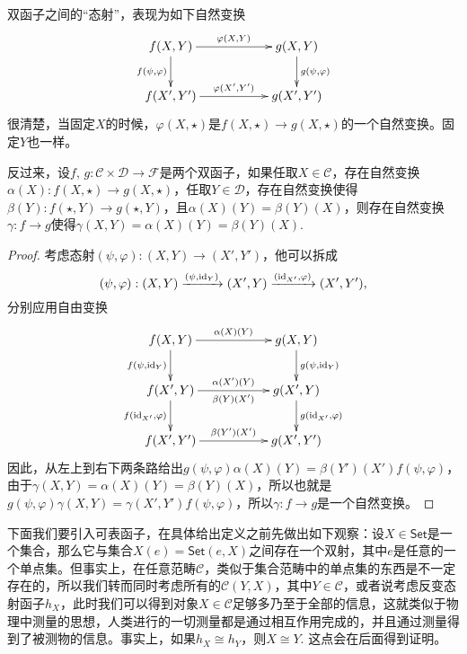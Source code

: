 \para 双函子之间的“态射”，表现为如下自然变换
\[
\begin{xy}
	\xymatrix{
		f(X,Y)\ar[rr]^{\varphi(X,Y)} \ar[d]_{f(\psi,\varphi)}&&g(X,Y) \ar[d]^{g(\psi,\varphi)}\\
		f(X',Y')\ar[rr]^{\varphi(X',Y')}&&g(X',Y')
	}
\end{xy}
\]
很清楚，当固定$X$的时候，$\varphi(X,\star)$是$f(X,\star)\to g(X,\star)$的一个自然变换。固定$Y$也一样。

反过来，设$f$, $g:\mathcal{C}\times \mathcal{D}\to \mathcal{F}$是两个双函子，如果任取$X\in \mathcal{C}$，存在自然变换$\alpha(X):f(X,\star)\to g(X,\star)$，任取$Y\in \mathcal{D}$，存在自然变换使得$\beta(Y):f(\star,Y)\to g(\star,Y)$，且$\alpha(X)(Y)=\beta(Y)(X)$，则存在自然变换$\gamma:f\to g$使得$\gamma(X,Y)=\alpha(X)(Y)=\beta(Y)(X)$.

\begin{proof}
	考虑态射$(\psi,\varphi):(X,Y)\to (X',Y')$，他可以拆成
	\[
		(\psi,\varphi): (X,Y) \xrightarrow{(\psi,\operatorname{id}_Y)} (X',Y)\xrightarrow{(\operatorname{id}_{X'},\varphi)} (X',Y'),
	\]
	分别应用自由变换
	\[
	\begin{xy}
		\xymatrix{
			f(X,Y)\ar[rr]^{\alpha(X)(Y)} \ar[d]_{f(\psi,\id_Y)}&&g(X,Y) \ar[d]^{g(\psi,\id_Y)}\\
			f(X',Y)\ar[rr]^{\alpha(X')(Y)}_{\beta(Y)(X')} \ar[d]_{f(\id_{X'},\varphi)}&&g(X',Y) \ar[d]^{g(\id_{X'},\varphi)}\\
			f(X',Y')\ar[rr]^{\beta(Y')(X')}&&g(X',Y')
		}
	\end{xy}
	\]
	因此，从左上到右下两条路给出$g(\psi,\varphi)\alpha(X)(Y)=\beta(Y')(X')f(\psi,\varphi)$，由于$\gamma(X,Y)=\alpha(X)(Y)=\beta(Y)(X)$，所以也就是$g(\psi,\varphi)\gamma(X,Y)=\gamma(X',Y')f(\psi,\varphi)$，所以$\gamma:f\to g$是一个自然变换。
\end{proof}



\para 下面我们要引入可表函子，在具体给出定义之前先做出如下观察：设$X\in\mathsf{Set}$是一个集合，那么它与集合$X(e)={\mathsf{Set}}(e,X)$之间存在一个双射，其中$e$是任意的一个单点集。但事实上，在任意范畴$\mathcal{C}$，类似于集合范畴中的单点集的东西是不一定存在的，所以我们转而同时考虑所有的${\mathcal{C}}(Y,X)$，其中$Y\in \mathcal{C}$，或者说考虑反变态射函子$h_X$，此时我们可以得到对象$X\in \mathcal{C}$足够多乃至于全部的信息，这就类似于物理中测量的思想，人类进行的一切测量都是通过相互作用完成的，并且通过测量得到了被测物的信息。事实上，如果$h_X\cong h_Y$，则$X\cong Y$. 这点会在后面得到证明。

